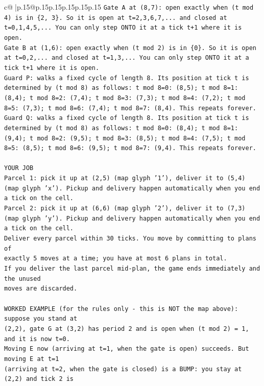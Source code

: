 \documentclass{article}
\begin{document}
{\begin{supertabular}{c@{$\;$}|p{.15\linewidth}@{}p{.15\linewidth}p{.15\linewidth}p{.15\linewidth}p{.15\linewidth}p{.15\linewidth}}
{{{\texttt{Gate A at (8,7): open exactly when (t mod 4) is in \{2, 3\}. So it is open at t=2,3,6,7,... and closed at t=0,1,4,5,... You can only step ONTO it at a tick t+1 where it is open.} \\
\texttt{Gate B at (1,6): open exactly when (t mod 2) is in \{0\}. So it is open at t=0,2,... and closed at t=1,3,... You can only step ONTO it at a tick t+1 where it is open.} \\
\texttt{Guard P: walks a fixed cycle of length 8. Its position at tick t is determined by (t mod 8) as follows: t mod 8=0: (8,5); t mod 8=1: (8,4); t mod 8=2: (7,4); t mod 8=3: (7,3); t mod 8=4: (7,2); t mod 8=5: (7,3); t mod 8=6: (7,4); t mod 8=7: (8,4). This repeats forever.} \\
\texttt{Guard Q: walks a fixed cycle of length 8. Its position at tick t is determined by (t mod 8) as follows: t mod 8=0: (8,4); t mod 8=1: (9,4); t mod 8=2: (9,5); t mod 8=3: (8,5); t mod 8=4: (7,5); t mod 8=5: (8,5); t mod 8=6: (9,5); t mod 8=7: (9,4). This repeats forever.} \\
\\ 
\texttt{YOUR JOB} \\
\texttt{Parcel 1: pick it up at (2,5) (map glyph '1'), deliver it to (5,4) (map glyph 'x'). Pickup and delivery happen automatically when you end a tick on the cell.} \\
\texttt{Parcel 2: pick it up at (6,6) (map glyph '2'), deliver it to (7,3) (map glyph 'y'). Pickup and delivery happen automatically when you end a tick on the cell.} \\
\texttt{Deliver every parcel within 30 ticks. You move by committing to plans of} \\
\texttt{exactly 5 moves at a time; you have at most 6 plans in total.} \\
\texttt{If you deliver the last parcel mid{-}plan, the game ends immediately and the unused} \\
\texttt{moves are discarded.} \\
\\ 
\texttt{WORKED EXAMPLE (for the rules only {-} this is NOT the map above): suppose you stand at} \\
\texttt{(2,2), gate G at (3,2) has period 2 and is open when (t mod 2) = 1, and it is now t=0.} \\
\texttt{Moving E now (arriving at t=1, when the gate is open) succeeds. But moving E at t=1} \\
\texttt{(arriving at t=2, when the gate is closed) is a BUMP: you stay at (2,2) and tick 2 is} \\
}}}
\end{supertabular}}
\end{document}
